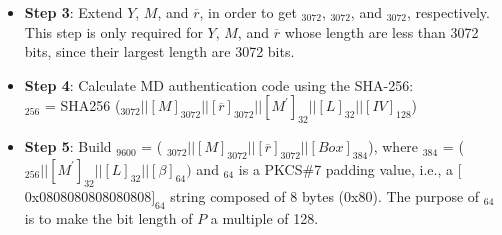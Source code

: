 \documentclass[main\_\_EN.tex]{subfiles}
\begin{document}
\begin{itemize}
    \item {\bfseries Step 3}: Extend \begin{math}Y\end{math}, \begin{math}M\end{math}, and \begin{math}\overline{r}\end{math}, in order to get \begin{math}[Y]_{3072}\end{math}, \begin{math}[M]_{3072}\end{math}, and \begin{math}[\overline{r}]_{3072}\end{math}, respectively. This step is only required for \begin{math}Y\end{math}, \begin{math}M\end{math}, and \begin{math}\overline{r}\end{math} whose length are less than 3072 bits, since their largest length are 3072 bits.
       
    
    \item {\bfseries Step 4}: Calculate MD authentication code using the SHA-256:\\
                \begin{math}[MD]_{256}\end{math} = SHA256 (\begin{math} 
                [Y]_{3072} ||
                [M]_{3072} ||
                [\overline{r}]_{3072} ||
                [M^{\prime}]_{32} ||
                [L]_{32} ||
                [IV]_{128} 
            \end{math})

    \item {\bfseries Step 5}: Build \begin{math}[P]_{9600}\end{math} = (
            \begin{math}
                [Y]_{3072} ||
                [M]_{3072} ||
                [\overline{r}]_{3072} ||
                [Box]_{384}
            \end{math}), where
            \begin{math}[Box]_{384}\end{math} = (
            \begin{math}
                [MD]_{256} ||
                [M^{\prime}]_{32} ||
                [L]_{32} ||
                [\beta]_{64}) 
            \end{math} and
            \begin{math}[\beta]_{64} \end{math} is a PKCS\#7 padding value, i.e., a $[$0x0808080808080808$]_{64}$ string composed of 8 bytes (0x80). The purpose of \begin{math}[\beta]_{64}\end{math} is to make the bit length of \begin{math}P\end{math} a multiple of 128.
    

\end{itemize}
\end{document}

